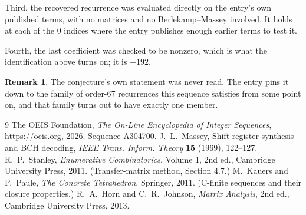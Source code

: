 \documentclass[11pt,a4paper]{article}
\theoremstyle{plain}
\theoremstyle{definition}
\newtheorem{remark}[theorem]{Remark}
\begin{document}
Third, the recovered recurrence was evaluated directly on the entry's own published terms, with
no matrices and no Berlekamp--Massey involved. It holds at each of the $0$ indices where
the entry publishes enough earlier terms to test it.

Fourth, the last coefficient was checked to be nonzero, which is what the identification above
turns on; it is $-192$.

\begin{remark}
The conjecture's own statement was never read. The entry pins it down to the family of
order-$67$ recurrences this sequence satisfies from some point on, and that family turns
out to have exactly one member.
\end{remark}

\begin{thebibliography}{9}
 The OEIS Foundation, \emph{The On-Line Encyclopedia of Integer
Sequences}, \url{https://oeis.org}, 2026. Sequence A304700.
 J.~L.~Massey, Shift-register synthesis and BCH decoding, \emph{IEEE
Trans. Inform. Theory} \textbf{15} (1969), 122--127.
 R.~P.~Stanley, \emph{Enumerative Combinatorics}, Volume 1, 2nd ed.,
Cambridge University Press, 2011. (Transfer-matrix method, Section 4.7.)
 M.~Kauers and P.~Paule, \emph{The Concrete Tetrahedron}, Springer, 2011.
(C-finite sequences and their closure properties.)
 R.~A.~Horn and C.~R.~Johnson, \emph{Matrix Analysis}, 2nd ed., Cambridge
University Press, 2013.
\end{thebibliography}
\end{document}
